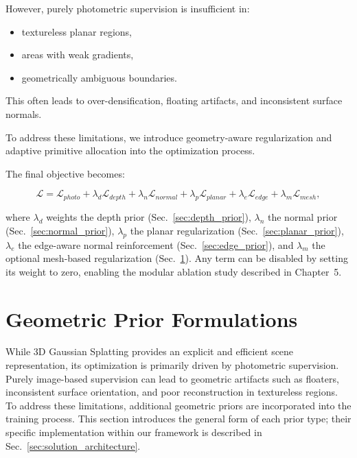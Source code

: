 However, purely photometric supervision is insufficient in:

\begin{itemize}
    \item textureless planar regions,
    \item areas with weak gradients,
    \item geometrically ambiguous boundaries.
\end{itemize}

This often leads to over-densification, floating artifacts, and inconsistent surface normals.

To address these limitations, we introduce geometry-aware regularization and adaptive primitive allocation into the optimization process.

The final objective becomes:

\begin{equation}
\mathcal{L} =
\mathcal{L}_{photo}
+
\lambda_d \mathcal{L}_{depth}
+
\lambda_n \mathcal{L}_{normal}
+
\lambda_p \mathcal{L}_{planar}
+
\lambda_e \mathcal{L}_{edge}
+
\lambda_m \mathcal{L}_{mesh},
\end{equation}

\noindent where $\lambda_d$ weights the depth prior (Sec.~\ref{sec:depth_prior}), $\lambda_n$ the normal prior (Sec.~\ref{sec:normal_prior}), $\lambda_p$ the planar regularization (Sec.~\ref{sec:planar_prior}), $\lambda_e$ the edge-aware normal reinforcement (Sec.~\ref{sec:edge_prior}), and $\lambda_m$ the optional mesh-based regularization (Sec.~\ref{sec:geometry_priors}). Any term can be disabled by setting its weight to zero, enabling the modular ablation study described in Chapter~5.

\section{Geometric Prior Formulations}
\label{sec:geometry_priors}

While 3D Gaussian Splatting provides an explicit and efficient scene representation, its optimization is primarily driven by photometric supervision. Purely image-based supervision can lead to geometric artifacts such as floaters, inconsistent surface orientation, and poor reconstruction in textureless regions. To address these limitations, additional geometric priors are incorporated into the training process. This section introduces the general form of each prior type; their specific implementation within our framework is described in Sec.~\ref{sec:solution_architecture}.

